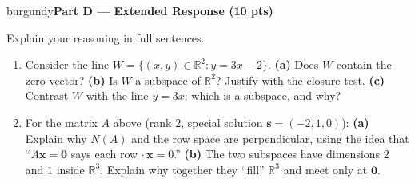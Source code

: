 \documentclass[10pt]{article}
\newcommand{\xx}{\mathbf{x}}
\newcommand{\zero}{\mathbf{0}}
\newcommand{\svec}{\mathbf{s}}
\newcommand{\parthead}[1]{%
  \vspace{6pt}\noindent
  \begin{headlinebox}{burgundy}{\color{white}\bfseries #1}\end{headlinebox}%
  \vspace{4pt}}
\begin{document}
\parthead{Part D --- Extended Response (10 pts)}
Explain your reasoning in full sentences.

\begin{enumerate}[leftmargin=1.9em, itemsep=16pt]
  \item Consider the line $W=\{(x,y)\in\mathbb{R}^2 : y=3x-2\}$.
        \textbf{(a)} Does $W$ contain the zero vector? \textbf{(b)} Is $W$ a subspace of $\mathbb{R}^2$?
        Justify with the closure test. \textbf{(c)} Contrast $W$ with the line $y=3x$: which is a
        subspace, and why?
        \vspace{3.0cm}
  \item For the matrix $A$ above (rank $2$, special solution $\svec=(-2,1,0)$):
        \textbf{(a)} Explain why $N(A)$ and the row space are perpendicular, using the idea that
        ``$A\xx=\zero$ says each row $\cdot\,\xx=0$.'' \textbf{(b)} The two subspaces have dimensions
        $2$ and $1$ inside $\mathbb{R}^3$. Explain why together they ``fill'' $\mathbb{R}^3$ and meet only
        at $\zero$.
        \vspace{2.8cm}
\end{enumerate}
\end{document}
